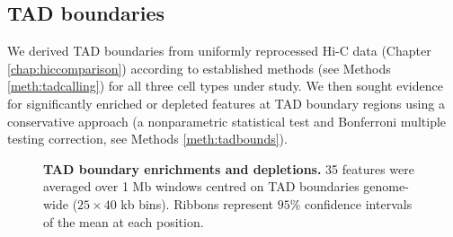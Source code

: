 \documentclass[a4paper,11pt,oneside]{book}
\begin{document}
\subsection{TAD boundaries}

We derived TAD boundaries from uniformly reprocessed Hi-C data (Chapter \ref{chap:hiccomparison}) according to established methods (see Methods \ref{meth:tadcalling}) for all three cell types under study. We then sought evidence for significantly enriched or depleted features at TAD boundary regions using a conservative approach (a nonparametric statistical test and Bonferroni multiple testing correction, see Methods \ref{meth:tadbounds}).

\begin{figure}
\begin{center} 
\captionsetup{width=\textwidth}
\caption[TAD boundary enrichments and depletions.]{ {\bf TAD boundary enrichments and depletions.}
35 features were averaged over 1 Mb windows centred on TAD boundaries genome-wide ($25 \times 40$ kb bins). Ribbons represent $95\%$ confidence intervals of the mean at each position.
}\label{fig:alltads}
\end{center}
\end{figure} 
\end{document}

